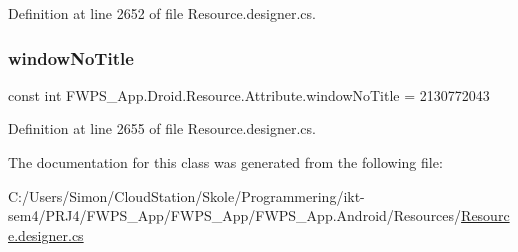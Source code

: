 Definition at line 2652 of file Resource.\+designer.\+cs.

\mbox{\label{class_f_w_p_s___app_1_1_droid_1_1_resource_1_1_attribute_ad8bf4398afb1ab1737761b912f5a6029}} 
\subsubsection{\texorpdfstring{window\+No\+Title}{windowNoTitle}}
{\footnotesize\ttfamily const int F\+W\+P\+S\+\_\+\+App.\+Droid.\+Resource.\+Attribute.\+window\+No\+Title = 2130772043}



Definition at line 2655 of file Resource.\+designer.\+cs.



The documentation for this class was generated from the following file\+:\begin{DoxyCompactItemize}
\item 
C\+:/\+Users/\+Simon/\+Cloud\+Station/\+Skole/\+Programmering/ikt-\/sem4/\+P\+R\+J4/\+F\+W\+P\+S\+\_\+\+App/\+F\+W\+P\+S\+\_\+\+App/\+F\+W\+P\+S\+\_\+\+App.\+Android/\+Resources/\mbox{\hyperlink{_resource_8designer_8cs}{Resource.\+designer.\+cs}}\end{DoxyCompactItemize}

